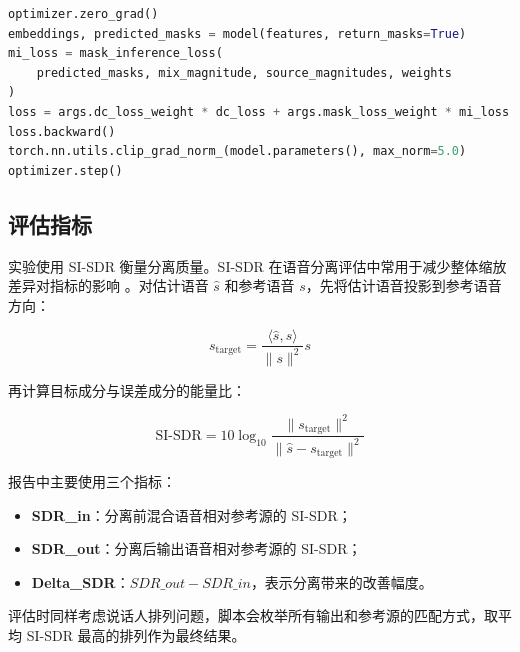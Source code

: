 \begin{lstlisting}[language=Python, caption={训练循环中的损失计算与参数更新}, label={code:train_loop}]
optimizer.zero_grad()
embeddings, predicted_masks = model(features, return_masks=True)
mi_loss = mask_inference_loss(
    predicted_masks, mix_magnitude, source_magnitudes, weights
)
loss = args.dc_loss_weight * dc_loss + args.mask_loss_weight * mi_loss
loss.backward()
torch.nn.utils.clip_grad_norm_(model.parameters(), max_norm=5.0)
optimizer.step()
\end{lstlisting}

\subsection{评估指标}

实验使用 SI-SDR 衡量分离质量。SI-SDR 在语音分离评估中常用于减少整体缩放差异对指标的影响 \cite{leroux2019sdr}。对估计语音 $\hat{s}$ 和参考语音 $s$，先将估计语音投影到参考语音方向：

\[
s_{\mathrm{target}} = \frac{\langle \hat{s}, s\rangle}{\|s\|^2}s
\]

再计算目标成分与误差成分的能量比：

\[
\mathrm{SI\mbox{-}SDR}
= 10\log_{10}
\frac{\|s_{\mathrm{target}}\|^2}
{\|\hat{s}-s_{\mathrm{target}}\|^2}
\]

报告中主要使用三个指标：

\begin{itemize}
    \item \textbf{SDR\_in}：分离前混合语音相对参考源的 SI-SDR；
    \item \textbf{SDR\_out}：分离后输出语音相对参考源的 SI-SDR；
    \item \textbf{Delta\_SDR}：$SDR\_out - SDR\_in$，表示分离带来的改善幅度。
\end{itemize}

评估时同样考虑说话人排列问题，脚本会枚举所有输出和参考源的匹配方式，取平均 SI-SDR 最高的排列作为最终结果。
